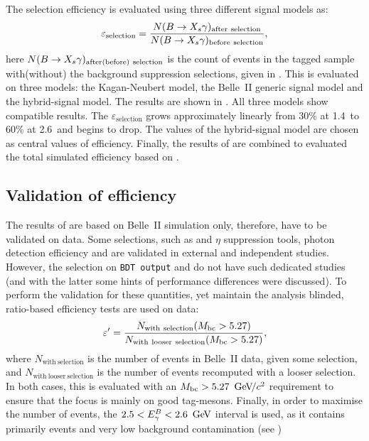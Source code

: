 The \BtoXsgamma selection efficiency is evaluated using three different signal models as:
\begin{equation}\label{eq:signal_efficiency}
    \varepsilon_{\mathrm{selection}} = \frac{N(\BtoXsgamma)_{\mathrm{after~selection}}}{N(\BtoXsgamma)_{\mathrm{before~selection}}},
\end{equation}
here $N(\BtoXsgamma)_{\mathrm{after(before)~selection}}$ is the count of \BtoXsgamma events in the \FEI tagged sample with(without) 
the background suppression selections, given in .
This is evaluated on three models: the Kagan-Neubert model, the Belle~II generic \MC signal model and the hybrid-signal model.
The results are shown in .
All three models show compatible results.
The $\varepsilon_{\mathrm{selection}}$ grows approximately linearly from 30\% at 1.4~\gev to 60\% at 2.6~\gev and begins to drop.
The values of the hybrid-signal model are chosen as central values of efficiency.
Finally, the results of  are combined to evaluated the total simulated efficiency based on .

\subsection{Validation of \texorpdfstring{\BtoXsgamma}{B->Xs gamma} efficiency}\label{sec:validation_efficiency}

The results of  are based on Belle~II simulation only, therefore, have to be validated on data.
Some selections, such as \piz and $\eta$ suppression tools, photon detection efficiency and \FEI are validated in external and independent studies.
However, the selection on \texttt{BDT~output} and \ZMVA do not have such dedicated studies (and with the latter some hints of performance differences were discussed).
To perform the validation for these quantities, yet maintain the analysis blinded, ratio-based efficiency tests are used on data:
\begin{equation}\label{eq:signal_validation}
    \varepsilon' = \frac{N_{\mathrm{with~selection}}({M_{\mathrm{bc}}}>5.27)}{N_{\mathrm{with~looser~selection}} ({M_{\mathrm{bc}}}>5.27)},
\end{equation}
where $N_{\mathrm{with~selection}}$ is the number of events in Belle~II data, given some selection,
and $N_{\mathrm{with~looser~selection}}$ is the number of events recomputed with a looser selection.
In both cases, this is evaluated with an ${M_{\mathrm{bc}}}>5.27~{\mathrm{\,Ge\kern -0.1em V\!/}c^2}$ requirement to ensure that the focus is mainly on good tag-\B mesons.
Finally, in order to maximise the number of \BtoXsgamma events, the $2.5<{E^B_{\gamma}}<2.6~\mathrm{\,Ge\kern -0.1em V}$ interval is used, as it contains primarily \BtoXsgamma events and very low background contamination (see )

